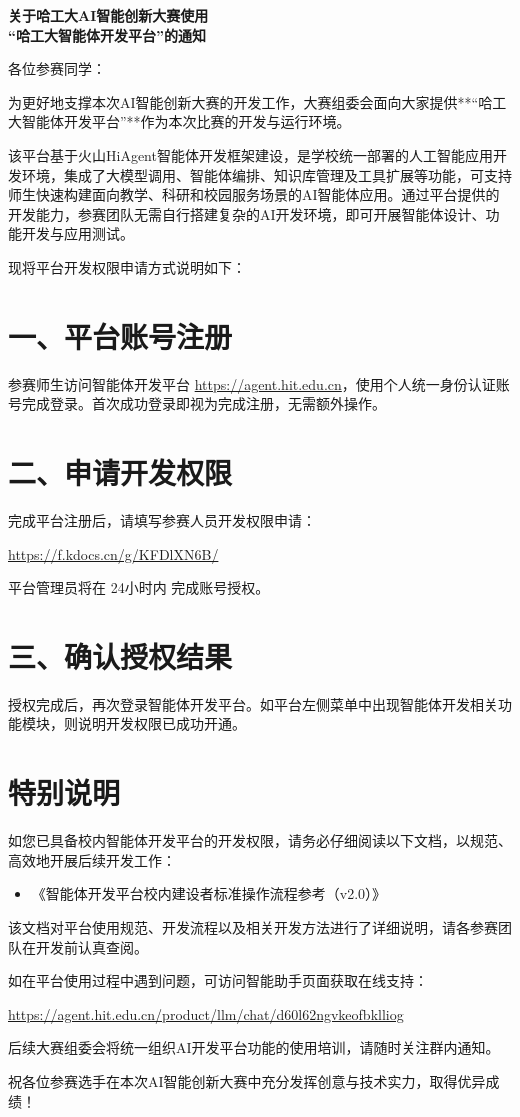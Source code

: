 \documentclass[12pt,a4paper]{article}
\begin{document}
\begin{center}
    \Large{\textbf{关于哈工大AI智能创新大赛使用\\“哈工大智能体开发平台”的通知}}
\end{center}

\vspace{1em}

各位参赛同学：

为更好地支撑本次AI智能创新大赛的开发工作，大赛组委会面向大家提供**“哈工大智能体开发平台”**作为本次比赛的开发与运行环境。

该平台基于火山HiAgent智能体开发框架建设，是学校统一部署的人工智能应用开发环境，集成了大模型调用、智能体编排、知识库管理及工具扩展等功能，可支持师生快速构建面向教学、科研和校园服务场景的AI智能体应用。通过平台提供的开发能力，参赛团队无需自行搭建复杂的AI开发环境，即可开展智能体设计、功能开发与应用测试。

现将平台开发权限申请方式说明如下：

\section{一、平台账号注册}
参赛师生访问智能体开发平台 \url{https://agent.hit.edu.cn}，使用个人统一身份认证账号完成登录。首次成功登录即视为完成注册，无需额外操作。

\section{二、申请开发权限}
完成平台注册后，请填写参赛人员开发权限申请：
\begin{center}
    \url{https://f.kdocs.cn/g/KFDlXN6B/}
\end{center}
平台管理员将在 24小时内 完成账号授权。

\section{三、确认授权结果}
授权完成后，再次登录智能体开发平台。如平台左侧菜单中出现智能体开发相关功能模块，则说明开发权限已成功开通。

\section{特别说明}
如您已具备校内智能体开发平台的开发权限，请务必仔细阅读以下文档，以规范、高效地开展后续开发工作：

\begin{itemize}
    \item 《智能体开发平台校内建设者标准操作流程参考（v2.0）》
\end{itemize}

该文档对平台使用规范、开发流程以及相关开发方法进行了详细说明，请各参赛团队在开发前认真查阅。

如在平台使用过程中遇到问题，可访问智能助手页面获取在线支持：
\begin{center}
    \url{https://agent.hit.edu.cn/product/llm/chat/d60l62ngvkeofbklliog}
\end{center}

后续大赛组委会将统一组织AI开发平台功能的使用培训，请随时关注群内通知。

\vspace{1.5em}

祝各位参赛选手在本次AI智能创新大赛中充分发挥创意与技术实力，取得优异成绩！
\end{document}
